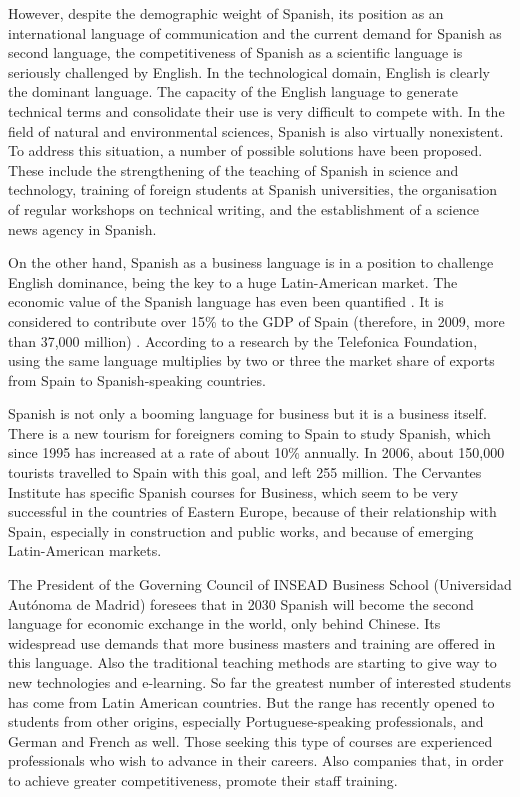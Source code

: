 \begin{multicols}{2}

However, despite the demographic weight of Spanish, its position as an international language of communication and the current demand for Spanish as second language, the competitiveness of Spanish as a scientific language is seriously challenged by English. In the technological domain, English is clearly the dominant language. The capacity of the English language to generate technical terms and consolidate their use is very difficult to compete with. In the field of natural and environmental sciences, Spanish is also virtually nonexistent. To address this situation, a number of possible solutions have been proposed. These include the strengthening of the teaching of Spanish in science and technology, training of foreign students at Spanish universities, the organisation of regular workshops on technical writing, and the establishment of a science news agency in Spanish.


On the other hand, Spanish as a business language is in a position to challenge English dominance, being the key to a huge Latin-American market. The economic value of the Spanish language has even been quantified  \cite{ecospanish1}.  It is considered to contribute over 15\% to the GDP of Spain (therefore, in 2009, more than 37,000 million) \cite{ecospanish2}. According to a research by the Telefonica Foundation, using the same language multiplies by two or three the market share of exports from Spain to Spanish-speaking countries.

Spanish is not only a booming language for business but it is a business itself. There is a new tourism for foreigners coming to Spain to study Spanish, which since 1995 has increased at a rate of about 10\% annually.  In 2006, about 150,000 tourists travelled to Spain with this goal, and left 255 million. The Cervantes Institute has specific Spanish courses for Business, which seem to be very successful in the countries of Eastern Europe, because of their relationship with Spain, especially in construction and public works, and because of emerging Latin-American markets.

The President of the Governing Council of INSEAD Business School (Universidad Autónoma de Madrid) foresees that in 2030 Spanish will become the second language for economic exchange in the world, only behind Chinese. Its widespread use demands that more business masters and training are offered in this language. Also the traditional teaching methods are starting to give way to new technologies and e-learning. So far the greatest number of interested students has come from Latin American countries. But the range has recently opened to students from other origins, especially Portuguese-speaking professionals, and German and French as well. Those seeking this type of courses are experienced professionals who wish to advance in their careers. Also companies that, in order to achieve greater competitiveness, promote their staff training.


\end{multicols}
